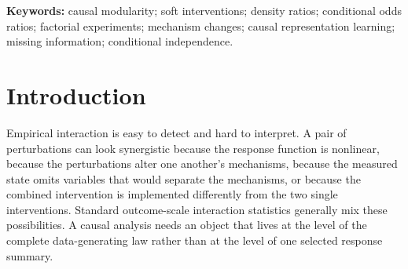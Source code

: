 \documentclass[11pt]{article}
\newcommand{\E}{\mathbb{E}}
\newcommand{\Cov}{\operatorname{Cov}}
\begin{document}
\begin{abstract}
For two perturbations we define the gauge-invariant mechanism-curvature field
\[
\kappa_{AB}(x)=\log\frac{p_{AB}(x)p_0(x)}{p_A(x)p_B(x)}.
\]
It is the conditional design log-odds ratio after subtracting the known sampling-design odds.  Full-state modularity implies \(\kappa\equiv0\); the converse additionally requires the certificate's locality and conditional-normalization conditions.  Marginalization can create curvature even when the complete mechanisms compose flatly.  We derive the exact identity
\[
e^{\kappa_{AB}(x)}-1=
\frac{\Cov_0(L_A,L_B\mid X=x)}{
\E_0[L_A\mid X=x]\E_0[L_B\mid X=x]},
\]
its Louis missing-information limit, three conservation laws connecting latent conditional coupling to observable ratio-field anticorrelation, and a nested state-expansion identity that turns curvature into a search criterion for missing measurements.

The inferential architecture has two complementary tracks.  With arbitrary regime-conditioned samples and externally justified state-independent sampling proportions, four-law functionals \(M_w\) identify weighted curvature without a product-assignment model.  Under verified product factorial randomization, residual-product scores test projected curvature.  Localization uses the same cross-fitted nuisance discipline; orientation uses simultaneous equivalence tests; and held-out combination prediction preserves the raw compositional normalizer.  The released implementation provides exact algebra and finite-state completion oracles plus explicitly uncalibrated cluster-cross-fitted diagnostics.  Calibrated closure inference and a controlled-real factorial result remain necessary before empirical certification claims.
\end{abstract}

\noindent\textbf{Keywords:} causal modularity; soft interventions; density ratios; conditional odds ratios; factorial experiments; mechanism changes; causal representation learning; missing information; conditional independence.

\tableofcontents
\newpage

\section{Introduction}

Empirical interaction is easy to detect and hard to interpret.  A pair of perturbations can look synergistic because the response function is nonlinear, because the perturbations alter one another's mechanisms, because the measured state omits variables that would separate the mechanisms, or because the combined intervention is implemented differently from the two single interventions.  Standard outcome-scale interaction statistics generally mix these possibilities.  A causal analysis needs an object that lives at the level of the complete data-generating law rather than at the level of one selected response summary.
\end{document}
